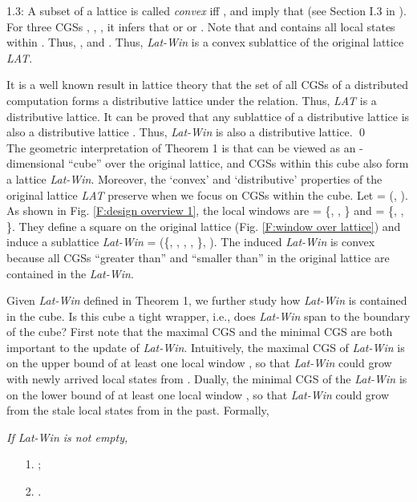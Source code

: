 \documentclass[12pt,journal,letterpaper,compsoc]{IEEEtran}
\begin{document}
1.3: A subset  of a lattice  is called {\it convex} iff , and  imply that  (see Section I.3 in \cite{Gratzer03}). For three CGSs , , , it infers that  or  or . Note that  and  contains all local states within . Thus, , and . Thus, {\it Lat-Win} is a convex sublattice of the original lattice {\it LAT}.

It is a well known result in lattice theory \cite{Davey02} that the set of all CGSs of a distributed computation forms a distributive lattice under the  relation. Thus, {\it LAT} is a distributive lattice. It can be proved that any sublattice of a distributive lattice is also a distributive lattice \cite{Davey02}. Thus, {\it Lat-Win} is also a distributive lattice. \qed \\

The geometric interpretation of Theorem 1 is that  can be viewed as an -dimensional ``cube'' over the original lattice, and CGSs within this cube also form a lattice {\it Lat-Win}. Moreover, the `convex' and `distributive' properties of the original lattice {\it LAT} preserve when we focus on CGSs within the cube. Let  = (, ). As shown in Fig. \ref{F:design overview 1}, the local windows are  = \{, , \} and  = \{, , \}. They define a square on the original lattice (Fig. \ref{F:window over lattice}) and induce a sublattice {\it Lat-Win} = (\{, , , , \}, ). The induced {\it Lat-Win} is convex because all CGSs ``greater than''  and ``smaller than''  in the original lattice are contained in the {\it Lat-Win}.

Given {\it Lat-Win} defined in Theorem 1, we further study how {\it Lat-Win} is contained in the cube. Is this cube a tight wrapper, i.e., does {\it Lat-Win} span to the boundary of the cube? First note that the maximal CGS and the minimal CGS are both important to the update of {\it Lat-Win}. Intuitively, the maximal CGS  of {\it Lat-Win} is on the upper bound  of at least one local window , so that {\it Lat-Win} could grow with newly arrived local states from . Dually, the minimal CGS  of the {\it Lat-Win} is on the lower bound  of at least one local window , so that {\it Lat-Win} could grow from the stale local states from  in the past. Formally,\\

 {\it If {\it Lat-Win} is not empty,
\begin{itemize}
    \item[1.] ;
    \item[2.] .
\end{itemize}}
\end{document}
